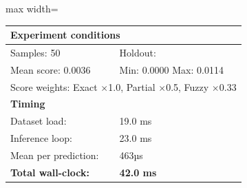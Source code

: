 \begin{table}[htbp]
\begin{adjustbox}{max width=\textwidth}
\begin{tabular}{r p{5cm} r r r r}
\midrule
\multicolumn{6}{l}{\textbf{Experiment conditions}} \\
\midrule
\multicolumn{3}{l}{Samples: 50} & \multicolumn{3}{l}{Holdout: } \\
\multicolumn{3}{l}{Mean score: 0.0036} & \multicolumn{3}{l}{Min: 0.0000 \quad Max: 0.0114} \\
\multicolumn{6}{l}{Score weights: Exact $\times$1.0, Partial $\times$0.5, Fuzzy $\times$0.33} \\
\midrule
\multicolumn{6}{l}{\textbf{Timing}} \\
\midrule
\multicolumn{3}{l}{Dataset load:} & \multicolumn{3}{l}{19.0 ms} \\
\multicolumn{3}{l}{Inference loop:} & \multicolumn{3}{l}{23.0 ms} \\
\multicolumn{3}{l}{Mean per prediction:} & \multicolumn{3}{l}{463µs} \\
\multicolumn{3}{l}{\textbf{Total wall-clock:}} & \multicolumn{3}{l}{\textbf{42.0 ms}} \\
\bottomrule
\end{tabular}
\end{adjustbox}
\end{table}
